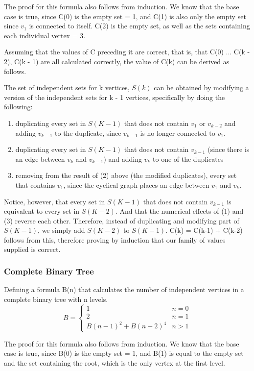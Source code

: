 \documentclass[11pt]{article}
\begin{document}
The proof for this formula also follows from induction. We know that the base case is true, since C(0) is the empty set = 1, and C(1) is also only the empty set since $v_1$ is connected to itself. C(2) is the empty set, as well as the sets containing each individual vertex = 3.

Assuming that the values of C preceding it are correct, that is, that C(0) ... C(k - 2), C(k - 1) are all calculated correctly, the value of C(k) can be derived as follows. 

The set of independent sets for k vertices, $S(k)$ can be obtained by modifying a version of the independent sets for k - 1 vertices, specifically by doing the following:\begin{enumerate}
	\item duplicating every set in $S(K - 1)$ that does not contain $v_1$ or $v_{k-2}$ and adding $v_{k-1}$ to the duplicate, since $v_{k-1}$ is no longer connected to $v_1$.
	\item duplicating every set in $S(K - 1)$ that does not contain $v_{k-1}$ (since there is an edge between $v_k$ and $v_{k-1}$) and adding $v_k$ to one of the duplicates
	\item removing from the result of (2) above (the modified duplicates), every set that contains $v_1$, since the cyclical graph places an edge between $v_1$ and $v_k$.
\end{enumerate}
Notice, however, that every set in $S(K-1)$ that does not contain $v_{k-1}$ is equivalent to every set in $S(K - 2)$. And that the numerical effects of (1) and (3) reverse each other. Therefore, instead of duplicating and modifying part of $S(K - 1)$, we simply add $S(K - 2)$ to $S(K - 1)$. C(k) = C(k-1) + C(k-2) follows from this, therefore proving by induction that our family of values supplied is correct.

\subsubsection{Complete Binary Tree}

Defining a formula B(n) that calculates the number of independent vertices in a complete binary tree with n levels.
$$ B = 
\begin{cases}
	1 & n = 0\\
	2 & n = 1\\
	B(n-1)^2 + B(n-2)^4 & n > 1
\end{cases}
$$ 

The proof for this formula also follows from induction. We know that the base case is true, since B(0) is the empty set = 1, and B(1) is equal to the empty set and the set containing the root, which is the only vertex at the first level.
\end{document}
